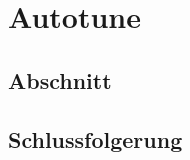 %
%
%
\chapter{Autotune\label{chapter:autotune}}
\begin{refsection}

\section{Abschnitt}

\section{Schlussfolgerung}

\printbibliography[heading=subbibliography]
\end{refsection}
